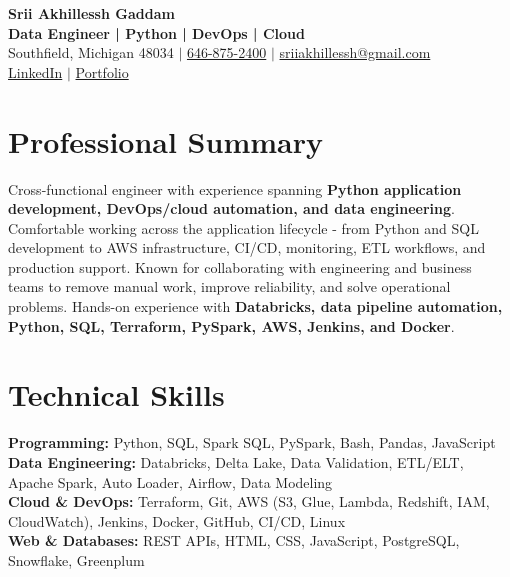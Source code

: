 \documentclass[letterpaper,10pt]{article}
\begin{document}
\fontsize{9.35pt}{10.45pt}\selectfont

\begin{center}
    {\LARGE \textbf{Srii Akhillessh Gaddam}} \\[-1pt]
    \textbf{Data Engineer | Python | DevOps | Cloud} \\[2pt]
    Southfield, Michigan 48034 $|$
    \href{tel:6468752400}{646-875-2400} $|$
    \href{mailto:sriiakhillessh@gmail.com}{sriiakhillessh@gmail.com} \\[1pt]
    \href{https://www.linkedin.com/in/srii-akhiilessh-gaddam-b48668191/}{LinkedIn} $|$
    \href{https://sriiakhillesshg.github.io/portfolio/}{Portfolio}
\end{center}
\vspace{-8pt}

\section{Professional Summary}
\small{Cross-functional engineer with experience spanning \textbf{Python application development, DevOps/cloud automation, and data engineering}. Comfortable working across the application lifecycle - from Python and SQL development to AWS infrastructure, CI/CD, monitoring, ETL workflows, and production support. Known for collaborating with engineering and business teams to remove manual work, improve reliability, and solve operational problems. Hands-on experience with \textbf{Databricks, data pipeline automation, Python, SQL, Terraform, PySpark, AWS, Jenkins, and Docker}.}

\section{Technical Skills}
\small{
\textbf{Programming:} Python, SQL, Spark SQL, PySpark, Bash, Pandas, JavaScript \\
\textbf{Data Engineering:} Databricks, Delta Lake, Data Validation, ETL/ELT, Apache Spark, Auto Loader, Airflow, Data Modeling \\
\textbf{Cloud \& DevOps:} Terraform, Git, AWS (S3, Glue, Lambda, Redshift, IAM, CloudWatch), Jenkins, Docker, GitHub, CI/CD, Linux \\
\textbf{Web \& Databases:} REST APIs, HTML, CSS, JavaScript, PostgreSQL, Snowflake, Greenplum
}

\end{document}
